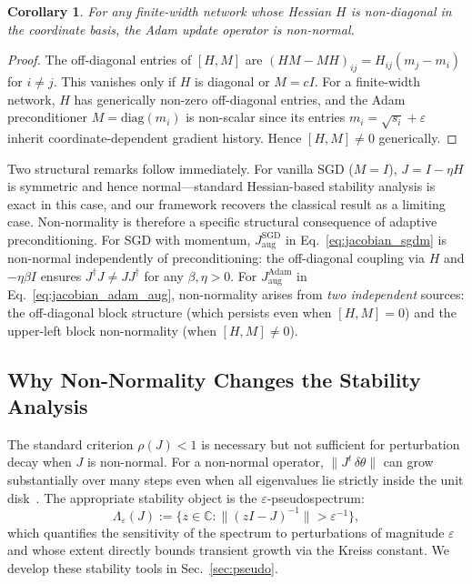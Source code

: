 \documentclass[aps,prresearch,twocolumn,superscriptaddress,longbibliography]{revtex4-2}
\newtheorem{corollary}{Corollary}
\newcommand{\C}{\mathbb{C}}
\newcommand{\diag}{\mathrm{diag}}
\begin{document}
\begin{corollary}
\label{cor:generic}
For any finite-width network whose Hessian $H$ is non-diagonal in the
coordinate basis, the Adam update operator is non-normal.
\end{corollary}

\begin{proof}
The off-diagonal entries of $[H,M]$ are
$(HM - MH)_{ij} = H_{ij}(m_j - m_i)$ for $i\neq j$.
This vanishes only if $H$ is diagonal or $M = cI$.
For a finite-width network, $H$ has generically non-zero off-diagonal
entries, and the Adam preconditioner $M = \diag(m_i)$ is non-scalar
since its entries $m_i = \sqrt{s_i}+\varepsilon$ inherit coordinate-dependent
gradient history.
Hence $[H,M]\neq 0$ generically.
\end{proof}

Two structural remarks follow immediately.
For vanilla SGD ($M = I$), $J = I - \eta H$ is symmetric and hence
normal---standard Hessian-based stability analysis is exact in this
case, and our framework recovers the classical result as a limiting
case.
Non-normality is therefore a specific structural consequence of
adaptive preconditioning.
For SGD with momentum, $J_{\mathrm{aug}}^{\mathrm{SGD}}$
in Eq.~\eqref{eq:jacobian_sgdm} is non-normal independently of
preconditioning: the off-diagonal coupling via $H$ and $-\eta\beta I$
ensures $J^\dagger J \neq JJ^\dagger$ for any $\beta,\eta > 0$.
For $J_{\mathrm{aug}}^{\mathrm{Adam}}$ in Eq.~\eqref{eq:jacobian_adam_aug},
non-normality arises from \emph{two independent} sources: the
off-diagonal block structure (which persists even when $[H,M]=0$) and
the upper-left block non-normality (when $[H,M]\neq 0$).

\subsection{Why Non-Normality Changes the Stability Analysis}

The standard criterion $\rho(J) < 1$ is necessary but not sufficient
for perturbation decay when $J$ is non-normal.
For a non-normal operator, $\|J^t\,\delta\theta\|$ can grow
substantially over many steps even when all eigenvalues lie strictly
inside the unit disk~\cite{trefethen2005,kreiss1962}.
The appropriate stability object is the $\varepsilon$-pseudospectrum:
\begin{equation}
\Lambda_\varepsilon(J) :=
\bigl\{z\in\C : \|(zI - J)^{-1}\| > \varepsilon^{-1}\bigr\},
\label{eq:pseudo}
\end{equation}
which quantifies the sensitivity of the spectrum to perturbations of
magnitude $\varepsilon$ and whose extent directly bounds transient
growth via the Kreiss constant.
We develop these stability tools in Sec.~\ref{sec:pseudo}.
\end{document}
